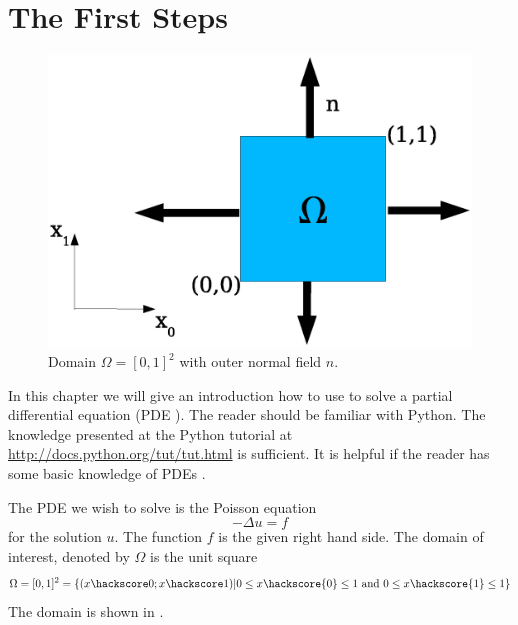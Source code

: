 
\section{The First Steps}
\label{FirstSteps} 

\begin{figure}
\centerline{\includegraphics[width=\figwidth]{FirstStepDomain}}
\caption{Domain $\Omega=[0,1]^2$ with outer normal field $n$.}
\label{fig:FirstSteps.1}
\end{figure}

In this chapter we will give an introduction how to use \escript to solve 
a partial differential equation  (PDE ). The reader should be familiar with Python. The knowledge presented at the Python tutorial at \url{http://docs.python.org/tut/tut.html}
is sufficient. It is helpful if the reader has some basic knowledge of PDEs .

The PDE  we wish to solve is the Poisson equation  
\begin{equation}
-\Delta u =f 
\label{eq:FirstSteps.1}
\end{equation}
for the solution $u$. The function $f$ is the given right hand side. The domain of interest, denoted by $\Omega$
is the unit square 
\begin{equation}
\Omega=[0,1]^2=\{ (x\hackscore 0;x\hackscore 1) | 0\le x\hackscore{0} \le 1 \mbox{ and } 0\le x\hackscore{1} \le 1 \}
\label{eq:FirstSteps.1b}
\end{equation}
The domain is shown in .

